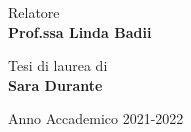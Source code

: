 \begin{titlepage}
\begin{minipage}[t]{0.47\textwidth}
	{\large{Relatore}{\normalsize\vspace{3mm}
    \bf\\ \large{Prof.ssa Linda Badii} \normalsize\vspace{3mm}\bf}}
\end{minipage}
\hfill
\begin{minipage}[t]{0.47\textwidth}\raggedleft
	{\large{Tesi di laurea di}{\normalsize\vspace{3mm} \bf\\ \large{Sara Durante}}}
\end{minipage}

\vspace{15mm}

\begin{center}
    {\large{Anno Accademico 2021-2022}}
\end{center}

\vspace{10mm}

\end{titlepage}
